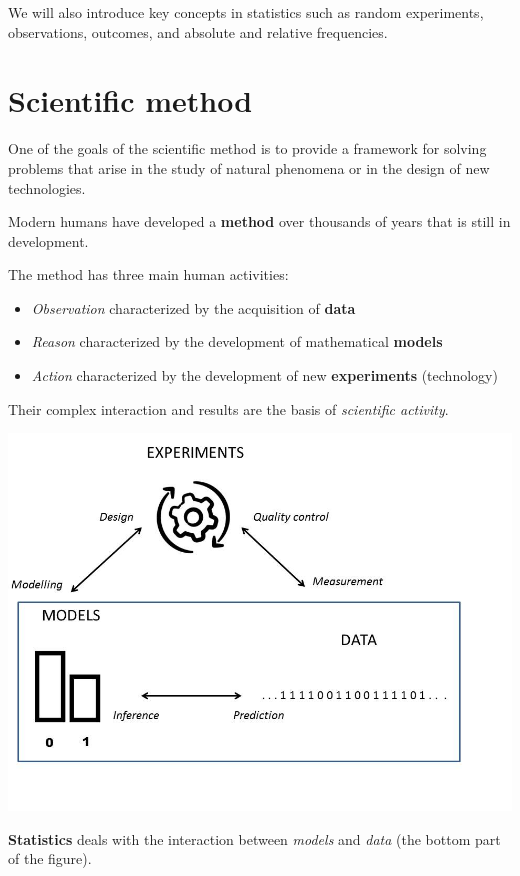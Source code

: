 \documentclass[
]{book}
\providecommand{\tightlist}{%
  \setlength{\itemsep}{0pt}\setlength{\parskip}{0pt}}
\begin{document}
We will also introduce key concepts in statistics such as random experiments, observations, outcomes, and absolute and relative frequencies.

\hypertarget{scientific-method}{%
\section{Scientific method}\label{scientific-method}}

One of the goals of the scientific method is to provide a framework for solving problems that arise in the study of natural phenomena or in the design of new technologies.

Modern humans have developed a \textbf{method} over thousands of years that is still in development.

The method has three main human activities:

\begin{itemize}
\tightlist
\item
  \emph{Observation} characterized by the acquisition of \textbf{data}
\item
  \emph{Reason} characterized by the development of mathematical \textbf{models}
\item
  \emph{Action} characterized by the development of new \textbf{experiments} (technology)
\end{itemize}

Their complex interaction and results are the basis of \emph{scientific activity}.

\includegraphics{./figures/stats.JPG}

\textbf{Statistics} deals with the interaction between \emph{models} and \emph{data} (the bottom part of the figure).
\end{document}
